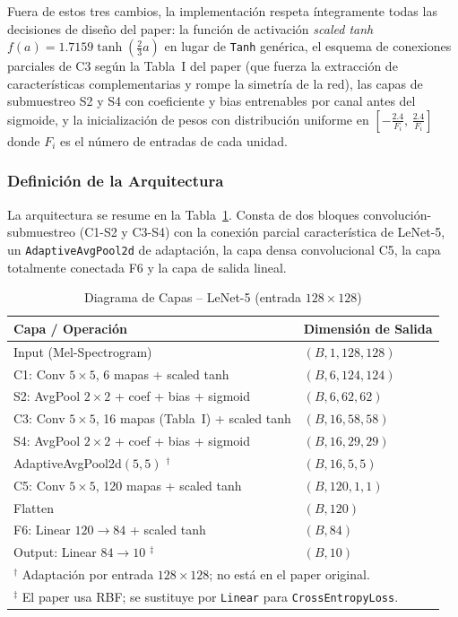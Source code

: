 \documentclass[conference]{IEEEtran}
\begin{document}
Fuera de estos tres cambios, la implementación respeta íntegramente todas las
decisiones de diseño del paper: la función de activación \textit{scaled tanh}
$f(a) = 1.7159 \tanh\!\left(\tfrac{2}{3}a\right)$ en lugar de \texttt{Tanh} genérica,
el esquema de conexiones parciales de C3 según la Tabla~I del paper (que fuerza la
extracción de características complementarias y rompe la simetría de la red),
las capas de submuestreo S2 y S4 con coeficiente y bias entrenables por canal antes
del sigmoide, y la inicialización de pesos con distribución uniforme en
$\left[-\tfrac{2.4}{F_i},\, \tfrac{2.4}{F_i}\right]$ donde $F_i$ es el número de
entradas de cada unidad.

\subsubsection{Definición de la Arquitectura}
La arquitectura se resume en la Tabla~\ref{tab:arquitectura}. Consta de dos bloques
convolución-submuestreo (C1-S2 y C3-S4) con la conexión parcial característica de
LeNet-5, un \texttt{AdaptiveAvgPool2d} de adaptación, la capa densa convolucional C5,
la capa totalmente conectada F6 y la capa de salida lineal.

\begin{table}[htbp]
\caption{Diagrama de Capas -- LeNet-5 (entrada $128\times128$)}
\label{tab:arquitectura}
\centering
\begin{tabular}{ll}
\toprule
\textbf{Capa / Operación} & \textbf{Dimensión de Salida} \\
\midrule
Input (Mel-Spectrogram)                          & $(B, 1, 128, 128)$ \\
C1: Conv $5\times5$, 6 mapas + scaled tanh       & $(B, 6, 124, 124)$ \\
S2: AvgPool $2\times2$ + coef + bias + sigmoid   & $(B, 6, 62, 62)$   \\
C3: Conv $5\times5$, 16 mapas (Tabla~I) + scaled tanh & $(B, 16, 58, 58)$ \\
S4: AvgPool $2\times2$ + coef + bias + sigmoid   & $(B, 16, 29, 29)$  \\
AdaptiveAvgPool2d$(5,5)$ $^\dagger$              & $(B, 16, 5, 5)$    \\
C5: Conv $5\times5$, 120 mapas + scaled tanh     & $(B, 120, 1, 1)$   \\
Flatten                                          & $(B, 120)$         \\
F6: Linear $120\to84$ + scaled tanh              & $(B, 84)$          \\
Output: Linear $84\to10$ $^\ddagger$             & $(B, 10)$          \\
\bottomrule
\multicolumn{2}{l}{\footnotesize $^\dagger$ Adaptación por entrada $128\times128$; no está en el paper original.} \\
\multicolumn{2}{l}{\footnotesize $^\ddagger$ El paper usa RBF; se sustituye por \texttt{Linear} para \texttt{CrossEntropyLoss}.} \\
\end{tabular}
\end{table}
\end{document}
